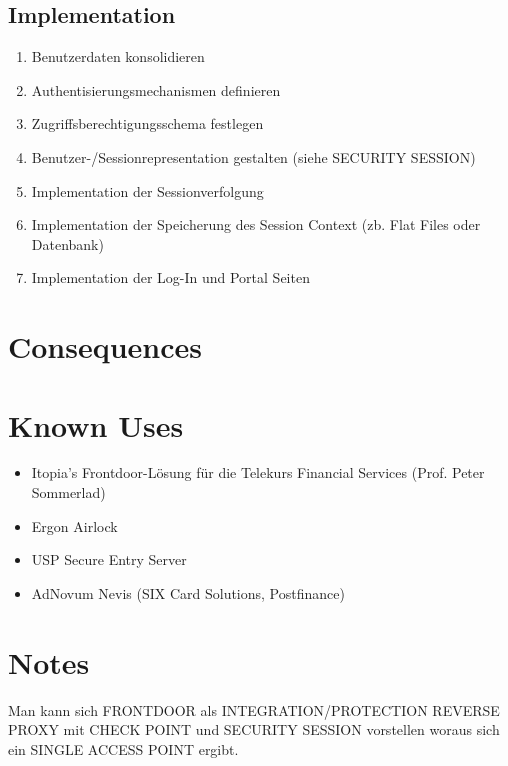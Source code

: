 \subsection{Implementation}
\begin{enumerate}
  \item Benutzerdaten konsolidieren
  \item Authentisierungsmechanismen definieren
  \item Zugriffsberechtigungsschema festlegen
  \item Benutzer-/Sessionrepresentation gestalten (siehe SECURITY SESSION)
  \item Implementation der Sessionverfolgung
  \item Implementation der Speicherung des Session Context (zb. Flat Files oder Datenbank)
  \item Implementation der Log-In und Portal Seiten
\end{enumerate}

\section{Consequences}
\begin{itemize}
\end{itemize}
\section{Known Uses}
\begin{itemize}
  \item Itopia's Frontdoor-Lösung für die Telekurs Financial Services (Prof. Peter Sommerlad)
  \item Ergon Airlock
  \item USP Secure Entry Server
  \item AdNovum Nevis (SIX Card Solutions, Postfinance)
\end{itemize}
\section{Notes}
Man kann sich FRONTDOOR als INTEGRATION/PROTECTION REVERSE PROXY mit CHECK POINT und SECURITY SESSION vorstellen woraus sich ein SINGLE ACCESS POINT ergibt.

